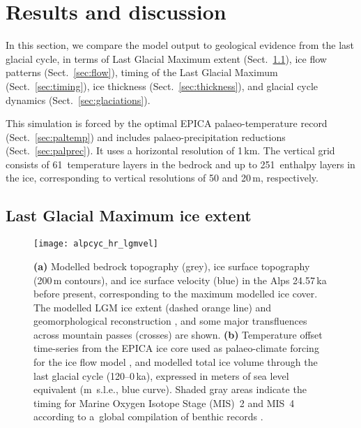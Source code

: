 \documentclass[tc, manuscript]{copernicus}
\begin{document}
\section{Results and discussion}
\label{sec:results}

    In this section, we compare the model output to geological evidence from
    the last glacial cycle, in terms of Last Glacial Maximum extent
    (Sect.~\ref{sec:extent}), ice flow patterns
    (Sect.~\ref{sec:flow}), timing of the Last Glacial Maximum
    (Sect.~\ref{sec:timing}), ice thickness (Sect.~\ref{sec:thickness}), and
    glacial cycle dynamics (Sect.~\ref{sec:glaciations}).

    This simulation is forced by the optimal EPICA palaeo-temperature record
    (Sect.~\ref{sec:paltemp}) and includes palaeo-precipitation reductions
    (Sect.~\ref{sec:palprec}). It uses a horizontal resolution of 1\,km. The
    vertical grid consists of 61~temperature layers in the bedrock and up to
    251~enthalpy layers in the ice, corresponding to vertical resolutions of 50
    and 20\,m, respectively.


\subsection{Last Glacial Maximum ice extent}
\label{sec:extent}

    \begin{figure*}[t]
      \centerline{\texttt{[image: alpcyc\_hr\_lgmvel]}}
      \caption{%
        \textbf{(a)} Modelled bedrock topography (grey), ice surface topography
        (200\,m contours), and ice surface velocity (blue) in the Alps
        24.57\,ka before present, corresponding to the maximum modelled ice
        cover. The modelled LGM ice extent (dashed orange line) and
        geomorphological reconstruction \citep[solid red
        line,][]{Ehlers.etal.2011}, and some major transfluences across
        mountain passes (crosses) are shown.
        \textbf{(b)} Temperature offset time-series from the EPICA ice core
        used as palaeo-climate forcing for the ice flow model \citep[black
        curve,][]{Jouzel.etal.2007}, and modelled total ice volume through the
        last glacial cycle (120--0\,ka), expressed in meters of sea level
        equivalent (m~s.l.e., blue curve). Shaded gray areas indicate the
        timing for Marine Oxygen Isotope Stage (MIS)~2 and MIS~4 according to
        a~global compilation of benthic  records
        \citep{Lisiecki.Raymo.2005}.}
      \label{fig:lgmvel}
    \end{figure*}
\end{document}
